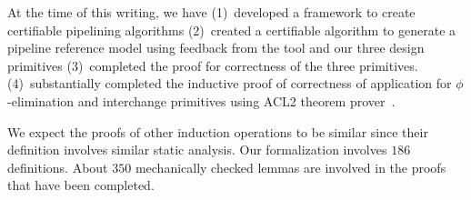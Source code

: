 At the time of this writing, we have (1)~developed a
framework to create certifiable pipelining algorithms (2)~created a
certifiable algorithm to generate a pipeline reference model
using feedback from the tool and our three design primitives
(3)~completed the proof for correctness of the three
primitives. (4)~substantially completed the inductive proof
of correctness of application for $\phi$-elimination and
interchange primitives using ACL2 theorem prover~\cite{car}.
 
We expect the proofs of other induction operations to be
similar since their definition involves similar static analysis. Our formalization involves
$186$ definitions. About $350$ mechanically checked
lemmas are involved in the proofs that have been completed.
